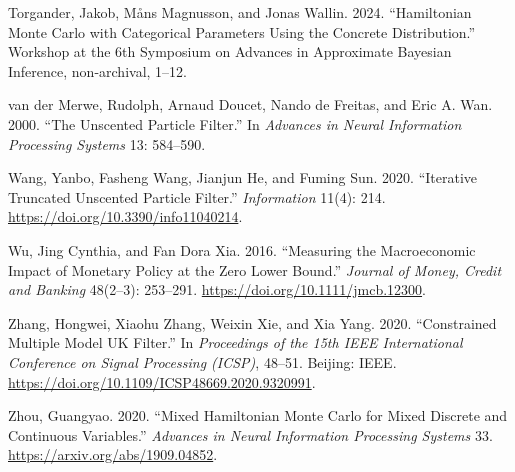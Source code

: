 \documentclass[11pt]{article}
\begin{document}
\begin{list}{}{\setlength{\leftmargin}{2em}\setlength{\itemindent}{-2em}\setlength{\itemsep}{2pt}\setlength{\parsep}{0pt}}
\item Torgander, Jakob, M\aa{}ns Magnusson, and Jonas Wallin. 2024. ``Hamiltonian Monte Carlo with Categorical Parameters Using the Concrete Distribution.'' Workshop at the 6th Symposium on Advances in Approximate Bayesian Inference, non-archival, 1--12.

\item van der Merwe, Rudolph, Arnaud Doucet, Nando de Freitas, and Eric A. Wan. 2000. ``The Unscented Particle Filter.'' In \emph{Advances in Neural Information Processing Systems} 13: 584--590.

\item Wang, Yanbo, Fasheng Wang, Jianjun He, and Fuming Sun. 2020. ``Iterative Truncated Unscented Particle Filter.'' \emph{Information} 11(4): 214. \url{https://doi.org/10.3390/info11040214}.

\item Wu, Jing Cynthia, and Fan Dora Xia. 2016. ``Measuring the Macroeconomic Impact of Monetary Policy at the Zero Lower Bound.'' \emph{Journal of Money, Credit and Banking} 48(2--3): 253--291. \url{https://doi.org/10.1111/jmcb.12300}.

\item Zhang, Hongwei, Xiaohu Zhang, Weixin Xie, and Xia Yang. 2020. ``Constrained Multiple Model UK Filter.'' In \emph{Proceedings of the 15th IEEE International Conference on Signal Processing (ICSP)}, 48--51. Beijing: IEEE. \url{https://doi.org/10.1109/ICSP48669.2020.9320991}.

\item Zhou, Guangyao. 2020. ``Mixed Hamiltonian Monte Carlo for Mixed Discrete and Continuous Variables.'' \emph{Advances in Neural Information Processing Systems} 33. \url{https://arxiv.org/abs/1909.04852}.

\end{list}
\end{document}
